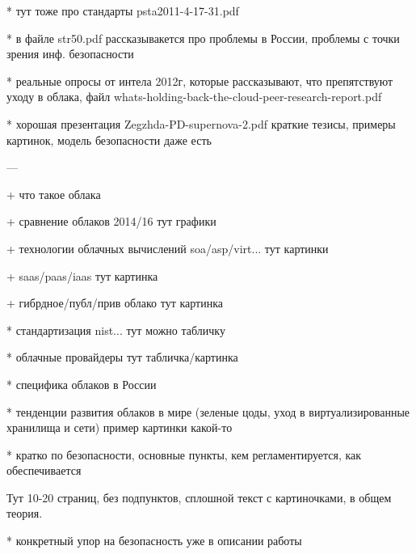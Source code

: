 * тут тоже про стандарты psta2011-4-17-31.pdf

* в файле str50.pdf рассказывакется про проблемы в России, проблемы с точки зрения инф. безопасности

* реальные опросы от интела 2012г, которые рассказывают, что препятствуют уходу в облака, файл whats-holding-back-the-cloud-peer-research-report.pdf

* хорошая презентация Zegzhda-PD-supernova-2.pdf краткие тезисы, примеры картинок, модель безопасности даже есть

---




+ что такое облака

+ сравнение облаков 2014/16 тут графики

+ технологии облачных вычислений soa/asp/virt... тут картинки

+ saas/paas/iaas тут картинка

+ гибрдное/публ/прив облако тут картинка

* стандартизация nist... тут можно табличку

* облачные провайдеры тут табличка/картинка

* специфика облаков в России

* тенденции развития облаков в мире (зеленые цоды, уход в виртуализированные хранилища и сети) пример картинки какой-то

* кратко по безопасности, основные пункты, кем регламентируется, как обеспечивается

Тут 10-20 страниц, без подпунктов, сплошной текст с картиночками, в общем теория.

* конкретный упор на безопасность уже в описании работы

\clearpage
